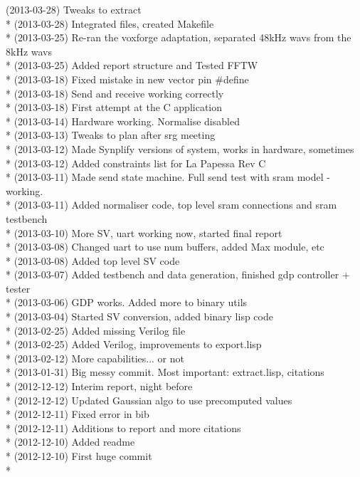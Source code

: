 (2013-03-28) Tweaks to extract \\*
(2013-03-28) Integrated files, created Makefile \\*
(2013-03-25) Re-ran the voxforge adaptation, separated 48kHz wavs from the 8kHz wavs \\*
(2013-03-25) Added report structure and Tested FFTW \\*
(2013-03-18) Fixed mistake in new vector pin \#define \\*
(2013-03-18) Send and receive working correctly \\*
(2013-03-18) First attempt at the C application \\*
(2013-03-14) Hardware working. Normalise disabled \\*
(2013-03-13) Tweaks to plan after srg meeting \\*
(2013-03-12) Made Synplify versions of system, works in hardware, sometimes \\*
(2013-03-12) Added constraints list for La Papessa Rev C \\*
(2013-03-11) Made send state machine. Full send test with sram model - working. \\*
(2013-03-11) Added normaliser code, top level sram connections and sram testbench \\*
(2013-03-10) More SV, uart working now, started final report \\*
(2013-03-08) Changed uart to use num buffers, added Max module, etc \\*
(2013-03-08) Added top level SV code \\*
(2013-03-07) Added testbench and data generation, finished gdp controller + tester \\*
(2013-03-06) GDP works. Added more to binary utils \\*
(2013-03-04) Started SV conversion, added binary lisp code \\*
(2013-02-25) Added missing Verilog file \\*
(2013-02-25) Added Verilog, improvements to export.lisp \\*
(2013-02-12) More capabilities... or not \\*
(2013-01-31) Big messy commit. Most important: extract.lisp, citations \\*
(2012-12-12) Interim report, night before \\*
(2012-12-12) Updated Gaussian algo to use precomputed values \\*
(2012-12-11) Fixed error in bib \\*
(2012-12-11) Additions to report and more citations \\*
(2012-12-10) Added readme \\*
(2012-12-10) First huge commit \\*
